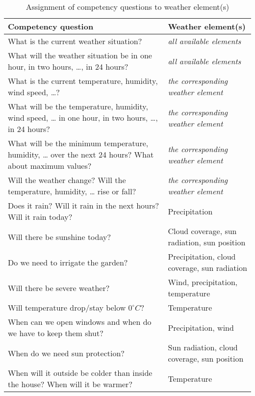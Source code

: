 \begin{table}
\begin{tabularx}{\textwidth}{|X|X|}
\hline
\textbf{Competency question} & \textbf{Weather element(s)} \\
\hline \hline
What is the current weather situation? & \emph{all available elements} \\
\hline
What will the weather situation be in one hour, in two hours, …, in 24 hours? & \emph{all available elements} \\
\hline
What is the current temperature, humidity, wind speed, …? & \emph{the corresponding weather element} \\
\hline
What will be the temperature, humidity, wind speed, … in one hour, in two hours, …, in 24 hours? & \emph{the corresponding weather element} \\
\hline
What will be the minimum temperature, humidity, … over the next 24 hours? What about maximum values? & \emph{the corresponding weather element} \\
\hline
Will the weather change? Will the temperature, humidity, … rise or fall? & \emph{the corresponding weather element} \\
\hline
Does it rain? Will it rain in the next hours? Will it rain today? & Precipitation \\
\hline
Will there be sunshine today? & Cloud coverage, sun radiation, sun position \\
\hline
Do we need to irrigate the garden? & Precipitation, cloud coverage, sun radiation \\
\hline
Will there be severe weather? & Wind, precipitation, temperature \\
\hline
Will temperature drop/stay below $0^\circ C$? & Temperature \\
\hline
When can we open windows and when do we have to keep them shut? & Precipitation, wind \\
\hline
When do we need sun protection? & Sun radiation, cloud coverage, sun position \\
\hline
When will it outside be colder than inside the house? When will it be warmer? & Temperature \\
\hline
\end{tabularx}
\label{table:competency_questions}
\caption{Assignment of competency questions to weather element(s)}
\end{table}
